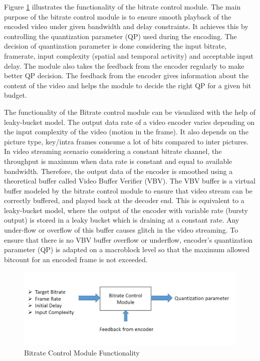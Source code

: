 \documentclass[11pt]{article} %
\begin{document}
	Figure \ref{fig:Bitrate Control Module Functionality} illustrates the functionality of the bitrate control module. The main purpose of the bitrate control module is to ensure smooth playback of the encoded video under given bandwidth and delay constraints.  It achieves this by controlling the quantization parameter (QP) used during the encoding. The decision of quantization parameter is done considering the input bitrate, framerate, input complexity (spatial and temporal activity) and acceptable input delay. The module also takes the feedback from the encoder regularly to make better QP decision.  The feedback from the encoder gives information about the content of the video and helps the module to decide the right QP for a given bit budget.
	
	The functionality of the Bitrate control module can be visualized with the help of leaky-bucket model. The output data rate of a video encoder varies depending on the input complexity of the video (motion in the frame). It also depends on the picture type,  key/intra frames consume a lot of bits compared to inter pictures. In video streaming scenario considering a constant bitrate channel, the throughput is maximum when data rate is constant and equal to available bandwidth. Therefore, the output data of the encoder is smoothed using a theoretical buffer called Video Buffer Verifier (VBV). The VBV buffer is a virtual buffer modeled by the bitrate control module to ensure that video stream can be correctly buffered, and played back at the decoder end. This is equivalent to a leaky-bucket model, where the output of the encoder with variable rate (bursty output) is stored in a leaky bucket which is draining at a constant rate.  Any under-flow or overflow of this buffer causes glitch in the video streaming. To ensure that there is no VBV buffer overflow or underflow, encoder's quantization parameter (QP) is adapted on a macroblock level so that the maximum allowed bitcount for an encoded frame is not exceeded.
	
\begin{figure}[h]
    \centering
    \includegraphics[scale=0.5]{RC_block}
    \caption{Bitrate Control Module Functionality}
    \label{fig:Bitrate Control Module Functionality}
\end{figure} 
\end{document}
